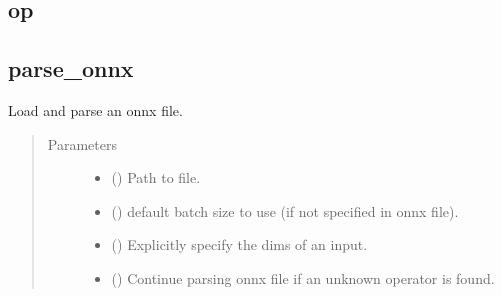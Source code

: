 \documentclass[letterpaper,10pt,english]{sphinxmanual}
\begin{document}
\subsection{op}
\label{\detokenize{reference/py:op}}

\subsection{parse\_onnx}
\label{\detokenize{reference/py:parse-onnx}}

\begin{fulllineitems}
\label{\detokenize{reference/py:migraphx.parse_onnx}}
\sphinxAtStartPar
Load and parse an onnx file.
\begin{quote}\begin{description}
\item[{Parameters}] \leavevmode\begin{itemize}
\item {} 
\sphinxAtStartPar
{} () \textendash{} Path to file.

\item {} 
\sphinxAtStartPar
{} () \textendash{} default batch size to use (if not specified in onnx file).

\item {} 
\sphinxAtStartPar
{} () \textendash{} Explicitly specify the dims of an input.

\item {} 
\sphinxAtStartPar
{} () \textendash{} Continue parsing onnx file if an unknown operator is found.


\end{itemize}
\end{description}
\end{quote}
\end{fulllineitems}
\end{document}

